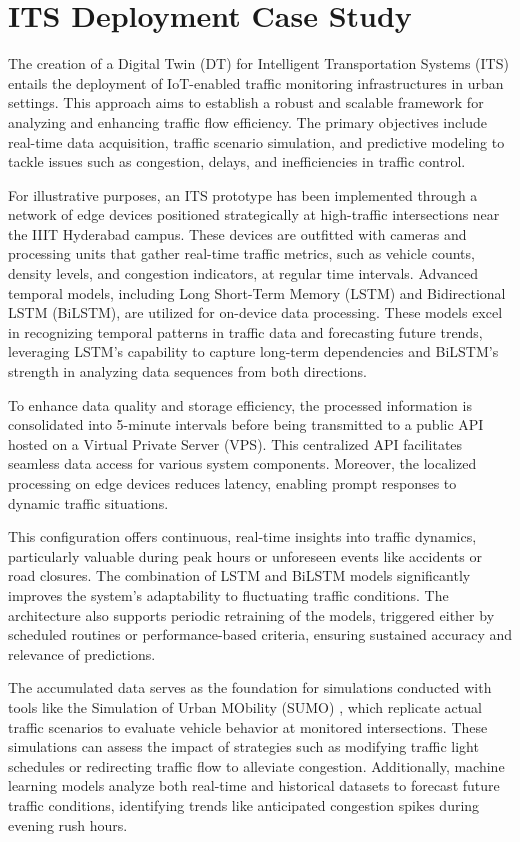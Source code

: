 \section{ITS Deployment Case Study}
\label{sec:usecase}
The creation of a Digital Twin (DT) for Intelligent Transportation Systems (ITS) entails the deployment of IoT-enabled traffic monitoring infrastructures in urban settings. This approach aims to establish a robust and scalable framework for analyzing and enhancing traffic flow efficiency. The primary objectives include real-time data acquisition, traffic scenario simulation, and predictive modeling to tackle issues such as congestion, delays, and inefficiencies in traffic control.

For illustrative purposes, an ITS prototype has been implemented through a network of edge devices positioned strategically at high-traffic intersections near the IIIT Hyderabad campus. These devices are outfitted with cameras and processing units that gather real-time traffic metrics, such as vehicle counts, density levels, and congestion indicators, at regular time intervals. Advanced temporal models, including Long Short-Term Memory (LSTM) and Bidirectional LSTM (BiLSTM), are utilized for on-device data processing. These models excel in recognizing temporal patterns in traffic data and forecasting future trends, leveraging LSTM's capability to capture long-term dependencies and BiLSTM's strength in analyzing data sequences from both directions.

To enhance data quality and storage efficiency, the processed information is consolidated into 5-minute intervals before being transmitted to a public API hosted on a Virtual Private Server (VPS). This centralized API facilitates seamless data access for various system components. Moreover, the localized processing on edge devices reduces latency, enabling prompt responses to dynamic traffic situations.

This configuration offers continuous, real-time insights into traffic dynamics, particularly valuable during peak hours or unforeseen events like accidents or road closures. The combination of LSTM and BiLSTM models significantly improves the system's adaptability to fluctuating traffic conditions. The architecture also supports periodic retraining of the models, triggered either by scheduled routines or performance-based criteria, ensuring sustained accuracy and relevance of predictions.

The accumulated data serves as the foundation for simulations conducted with tools like the Simulation of Urban MObility (SUMO) \cite{SUMO2018}, which replicate actual traffic scenarios to evaluate vehicle behavior at monitored intersections. These simulations can assess the impact of strategies such as modifying traffic light schedules or redirecting traffic flow to alleviate congestion. Additionally, machine learning models analyze both real-time and historical datasets to forecast future traffic conditions, identifying trends like anticipated congestion spikes during evening rush hours.

